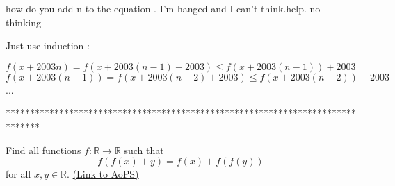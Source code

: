 \begin{solution}
	\begin{tcolorbox}how do you add n to the equation . I'm hanged and I can't think.help. no thinking\end{tcolorbox}
Just use induction :

$f(x+2003n)=f(x+2003(n-1)+2003)\le f(x+2003(n-1))+2003$
$f(x+2003(n-1))=f(x+2003(n-2)+2003)\le f(x+2003(n-2))+2003$
...
\end{solution}
*******************************************************************************
-------------------------------------------------------------------------------

\begin{problem}
	Find all functions $f: \mathbb{R} \rightarrow \mathbb{R}$ such that \[f(f(x)+y)=f(x)+f(f(y))\] for all $x,y \in \mathbb{R}$.
	\flushright \href{https://artofproblemsolving.com/community/c6h448123}{(Link to AoPS)}
\end{problem}



